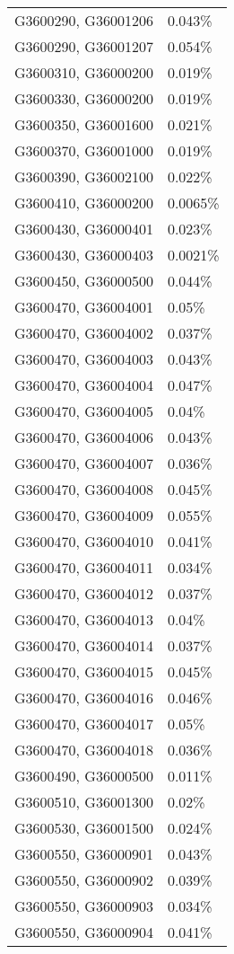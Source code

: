 \begin{longtable}[]{@{}ll@{}}
G3600290, G36001206 & 0.043\% \\
G3600290, G36001207 & 0.054\% \\
G3600310, G36000200 & 0.019\% \\
G3600330, G36000200 & 0.019\% \\
G3600350, G36001600 & 0.021\% \\
G3600370, G36001000 & 0.019\% \\
G3600390, G36002100 & 0.022\% \\
G3600410, G36000200 & 0.0065\% \\
G3600430, G36000401 & 0.023\% \\
G3600430, G36000403 & 0.0021\% \\
G3600450, G36000500 & 0.044\% \\
G3600470, G36004001 & 0.05\% \\
G3600470, G36004002 & 0.037\% \\
G3600470, G36004003 & 0.043\% \\
G3600470, G36004004 & 0.047\% \\
G3600470, G36004005 & 0.04\% \\
G3600470, G36004006 & 0.043\% \\
G3600470, G36004007 & 0.036\% \\
G3600470, G36004008 & 0.045\% \\
G3600470, G36004009 & 0.055\% \\
G3600470, G36004010 & 0.041\% \\
G3600470, G36004011 & 0.034\% \\
G3600470, G36004012 & 0.037\% \\
G3600470, G36004013 & 0.04\% \\
G3600470, G36004014 & 0.037\% \\
G3600470, G36004015 & 0.045\% \\
G3600470, G36004016 & 0.046\% \\
G3600470, G36004017 & 0.05\% \\
G3600470, G36004018 & 0.036\% \\
G3600490, G36000500 & 0.011\% \\
G3600510, G36001300 & 0.02\% \\
G3600530, G36001500 & 0.024\% \\
G3600550, G36000901 & 0.043\% \\
G3600550, G36000902 & 0.039\% \\
G3600550, G36000903 & 0.034\% \\
G3600550, G36000904 & 0.041\% \\

\end{longtable}
